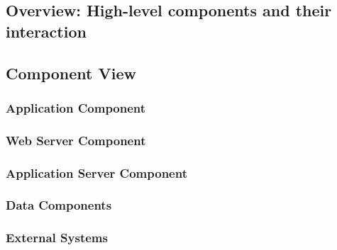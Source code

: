 \documentclass[11pt]{article}
\begin{document}





\subsection{Overview: High-level components and their interaction}

\subsection{Component View}

\subsubsection{Application Component}

\subsubsection{Web Server Component}

\subsubsection{Application Server Component}

\subsubsection{Data Components}


\subsubsection{External Systems}
\end{document}
